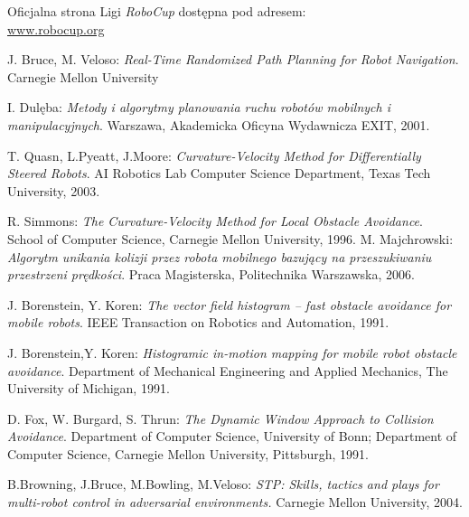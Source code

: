 \begin{thebibliography}{9}
	Oficjalna strona Ligi \textit{RoboCup} dostępna pod adresem:\\
	\url{www.robocup.org}
	
J. Bruce, M. Veloso:
\emph{Real-Time Randomized Path Planning for Robot Navigation}. Carnegie Mellon University

	I. Dulęba:
	\emph{Metody i algorytmy planowania ruchu robotów mobilnych i manipulacyjnych}.
	Warszawa, Akademicka Oficyna Wydawnicza EXIT, 2001.

	T. Quasn, L.Pyeatt, J.Moore:
	\emph{Curvature-Velocity Method for Differentially Steered Robots}.
	AI Robotics Lab
	Computer Science Department,
	Texas Tech University, 2003.

	R. Simmons:
	\emph{The Curvature-Velocity Method for Local Obstacle Avoidance}.
	School of Computer Science,
	Carnegie Mellon University, 1996.
	M. Majchrowski:
	\emph{Algorytm unikania kolizji przez robota mobilnego bazujący na przeszukiwaniu
	przestrzeni prędkości}.
	Praca Magisterska, Politechnika Warszawska, 2006.

	J. Borenstein, Y. Koren:
	\emph{ The vector field histogram -- fast obstacle avoidance for mobile robots}.
	IEEE Transaction on Robotics and Automation, 1991.

	J. Borenstein,Y. Koren:
	\emph{Histogramic in-motion mapping
	for mobile robot obstacle avoidance}.
	Department of Mechanical Engineering and Applied Mechanics,
	The University of Michigan, 1991.

	D. Fox, W. Burgard, S. Thrun:
	\emph{The Dynamic Window Approach to Collision Avoidance}.
	Department of Computer Science, University of Bonn;
	Department of Computer Science, Carnegie Mellon University, Pittsburgh, 1991.
		
	B.Browning, J.Bruce, M.Bowling, M.Veloso:
	\emph{STP: Skills, tactics and plays for multi-robot control
             in adversarial environments.}
	  Carnegie Mellon University, 2004.
	  
\end{thebibliography}
